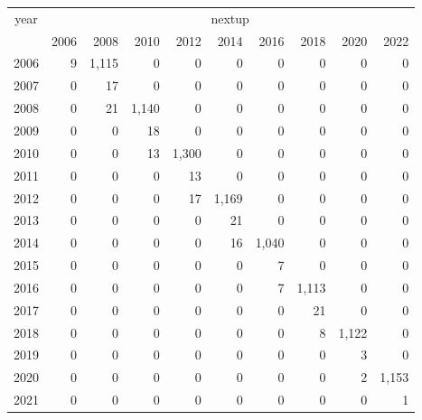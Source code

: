 \footnotesize\begin{tabular}[t]{lrrrrrrrrr}
\toprule
\multicolumn{1}{c}{year} & \multicolumn{9}{c}{nextup} \\
\cmidrule(l{3pt}r{3pt}){1-1} \cmidrule(l{3pt}r{3pt}){2-10}
  & 2006 & 2008 & 2010 & 2012 & 2014 & 2016 & 2018 & 2020 & 2022\\
\midrule
2006 & 9 & 1,115 & 0 & 0 & 0 & 0 & 0 & 0 & 0\\
2007 & 0 & 17 & 0 & 0 & 0 & 0 & 0 & 0 & 0\\
2008 & 0 & 21 & 1,140 & 0 & 0 & 0 & 0 & 0 & 0\\
2009 & 0 & 0 & 18 & 0 & 0 & 0 & 0 & 0 & 0\\
2010 & 0 & 0 & 13 & 1,300 & 0 & 0 & 0 & 0 & 0\\
2011 & 0 & 0 & 0 & 13 & 0 & 0 & 0 & 0 & 0\\
2012 & 0 & 0 & 0 & 17 & 1,169 & 0 & 0 & 0 & 0\\
2013 & 0 & 0 & 0 & 0 & 21 & 0 & 0 & 0 & 0\\
2014 & 0 & 0 & 0 & 0 & 16 & 1,040 & 0 & 0 & 0\\
2015 & 0 & 0 & 0 & 0 & 0 & 7 & 0 & 0 & 0\\
2016 & 0 & 0 & 0 & 0 & 0 & 7 & 1,113 & 0 & 0\\
2017 & 0 & 0 & 0 & 0 & 0 & 0 & 21 & 0 & 0\\
2018 & 0 & 0 & 0 & 0 & 0 & 0 & 8 & 1,122 & 0\\
2019 & 0 & 0 & 0 & 0 & 0 & 0 & 0 & 3 & 0\\
2020 & 0 & 0 & 0 & 0 & 0 & 0 & 0 & 2 & 1,153\\
2021 & 0 & 0 & 0 & 0 & 0 & 0 & 0 & 0 & 1\\
\bottomrule
\end{tabular}
